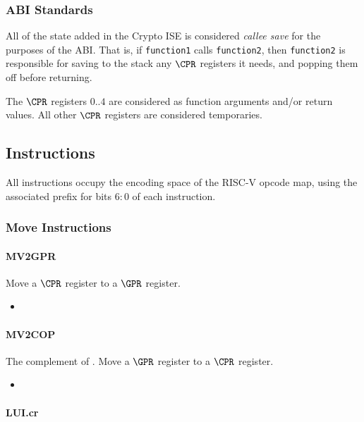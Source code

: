 \subsubsection{ABI Standards}

All of the state added in the Crypto ISE is considered {\em callee save}
for the purposes of the ABI. That is, if {\tt function1} calls 
{\tt function2}, then {\tt function2} is responsible for saving to the
stack any $\CPR$ registers it needs, and popping them off before returning.

The $\CPR$ registers $0..4$ are considered as function arguments
and/or return values. 
All other $\CPR$ registers are considered temporaries.

\subsection{Instructions}

All instructions occupy the \encspace encoding space of the RISC-V opcode
map, using the associated \encopcode prefix for bits $6:0$ of each 
instruction.

\subsubsection{Move Instructions}
\paragraph{MV2GPR}

Move a $\CPR$ register to a $\GPR$ register.

\begin{itemize}
\item {}
\end{itemize}


\paragraph{MV2COP}

The complement of .
Move a $\GPR$ register to a $\CPR$ register.

\begin{itemize}
\item {}
\end{itemize}

\paragraph{LUI.cr}

